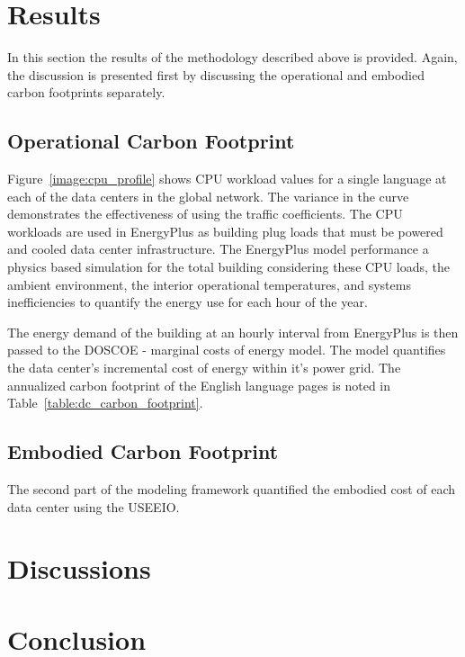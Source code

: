        

\section{Results}
    In this section the results of the methodology described above is provided. Again, the discussion is presented first by discussing the operational and embodied carbon footprints separately. 
    
    \subsection{Operational Carbon Footprint}
    Figure~\ref{image:cpu_profile} shows CPU workload values for a single language at each of the data centers in the global network. The variance in the curve demonstrates the effectiveness of using the traffic coefficients. The CPU workloads are used in EnergyPlus as building plug loads that must be powered and cooled data center infrastructure. The EnergyPlus model performance a physics based simulation for the total building considering these CPU loads, the ambient environment, the interior operational temperatures, and systems inefficiencies to quantify the energy use for each hour of the year.
    

    
    
    The energy demand of the building at an hourly interval from EnergyPlus is then passed to the DOSCOE - marginal costs of energy model. The model quantifies the data center's incremental cost of energy within it's power grid. The annualized carbon footprint of the English language pages is noted in Table~\ref{table:dc_carbon_footprint}.

    
    
    \subsection{Embodied Carbon Footprint}
    The second part of the modeling framework quantified the embodied cost of each data center using the USEEIO. 
    

    
    
    
    
    
    
\section{Discussions}
\section{Conclusion}


        